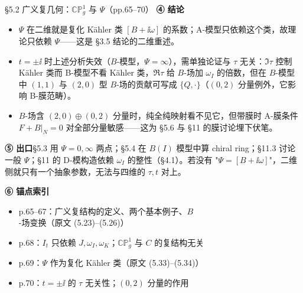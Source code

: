 \begin{kcard}{§5.2 广义复几何：$\mathbb{CP}^1_g$ 与 $\Psi$（pp.65--70）}
\noindent\textbf{④ 结论}\quad
\begin{itemize}
\item $\Psi$ 在二维就是复化 Kähler 类 $[B+\ii\omega]$ 的系数；A-模型只依赖这个类，故理论只依赖 $\Psi$——这是 \S3.5 结论的二维重述。\pA{}
\item $t=\pm\ii$ 时上述分析失效（$B$-模型，$\Psi=\infty$），需单独论证与 $\tau$ 无关：$\Im\tau$ 控制 Kähler 类而 B-模型不看 Kähler 类，$\Re\tau$ 给 $B$-场加 $\omega_I$ 的倍数，但在 $B$-模型中 $(1,1)$ 与 $(2,0)$ 型 $B$-场的贡献可写成 $\{Q,\cdot\}$（$(0,2)$ 分量例外，它影响 B-膜范畴）。\pA{}
\item $B$-场含 $(2,0)\oplus(0,2)$ 分量时，纯全纯映射看不见它，但带膜时 A-膜条件 $F+B|_N=0$ 对全部分量敏感——这为 \S5.6 与 \S11 的膜讨论埋下伏笔。\pA{}
\end{itemize}

\noindent\textbf{⑤ 出口}\quad \S5.3 用 $\Psi=0,\infty$ 两点；\S5.4 在 $B(I)$ 模型中算 chiral ring；\S11.3 讨论一般 $\Psi$；\S11 的 D-模构造依赖 $\omega_I$ 的整性（\S4.1）。若没有 "$\Psi=[B+\ii\omega]$"，二维侧就只有一个抽象参数，无法与四维的 $\tau,t$ 对上。\pB{}

\noindent\textbf{⑥ 锚点索引}\quad
\begin{itemize}
\item p.65--67：广义复结构的定义、两个基本例子、$B$-场变换（原文 (5.23)--(5.26)）
\item p.68：$I_t$ 只依赖 $J,\omega_I,\omega_K$；$\mathbb{CP}^1_g$ 与 $C$ 的复结构无关
\item p.69：$\Psi$ 作为复化 Kähler 类（原文 (5.33)--(5.34)）
\item p.70：$t=\pm\ii$ 的 $\tau$ 无关性；$(0,2)$ 分量的作用
\end{itemize}
\end{kcard}

\noindent{}

\noindent{}

